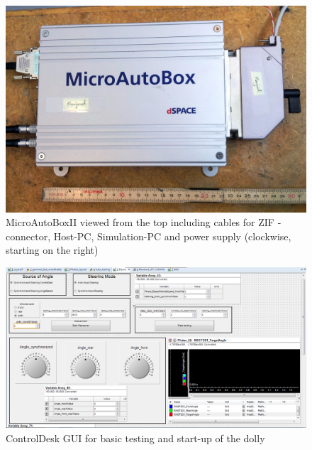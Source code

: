 \documentclass[ExampleMasters.tex]{subfiles}
\begin{document}
\begin{figure}[h]
	\centering
	\includegraphics[width=1\linewidth]{figures/MABII_topview_cropped}
	\caption{MicroAutoBoxII viewed from the top including cables for \gls{ZIF} -connector, Host-PC, Simulation-PC and power supply (clockwise, starting on the right)}
	\label{fig:microautobox_topview}
\end{figure}


\begin{figure}[h]
	\centering
	\includegraphics[width=1\linewidth]{figures/CD_Layout}
	\caption{ControlDesk \gls{GUI} for basic testing and start-up of the dolly}	
	\label{fig:control_desk_GUI}
\end{figure}
\end{document}
